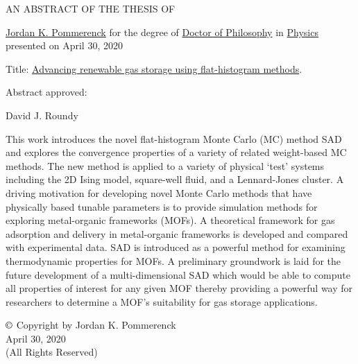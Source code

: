 \thispagestyle{empty}
\begin{center}
	\large
	AN ABSTRACT OF THE THESIS OF
\end{center}


\justify{}
\underline{Jordan K. Pommerenck} for the degree of \underline{Doctor of Philosophy} in \underline{Physics}
presented on April 30, 2020
\vspace{1.0cm}

\justify{}
Title: \underline{Advancing renewable gas storage using flat-histogram methods}.
\vspace{2.0cm}

\justify{}
Abstract approved:
\underline{\hspace{11cm}}
\vspace{0.5cm}

\hspace{7.0cm} David J. Roundy
\vspace{1.0cm}

\justify{}
\doublespacing
This work introduces the novel flat-histogram Monte
Carlo (MC) method SAD and explores the convergence properties of a
variety of related weight-based MC methods. The new method is applied
to a variety of physical ‘test’ systems including the 2D Ising model,
square-well fluid, and a Lennard-Jones cluster. A driving motivation for
developing novel Monte Carlo methods that have physically based tunable
parameters is to provide simulation methods for exploring metal-organic
frameworks (MOFs). A theoretical framework for gas adsorption and
delivery in metal-organic frameworks is developed and compared with
experimental data. SAD is introduced as a powerful method for examining
thermodynamic properties for MOFs. A preliminary groundwork is laid for
the future development of a multi-dimensional SAD which would be able
to compute all properties of interest for any given MOF thereby providing a powerful way for researchers to determine a MOF’s suitability for gas storage
applications.


\newpage{}
\thispagestyle{empty}
\singlespacing

\vspace*{4.0cm}
\begin{center}
$\copyright$ Copyright by Jordan K. Pommerenck \\
April 30, 2020 \\
(All Rights Reserved)
\end{center}

\newpage{}
\thispagestyle{empty}
\singlespacing

